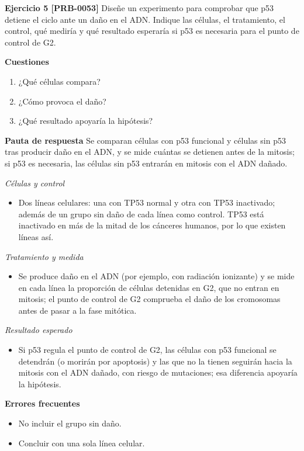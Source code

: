 \documentclass{book}
\begin{document}
\noindent\textbf{Ejercicio 5 [PRB-0053]}
Diseñe un experimento para comprobar que p53 detiene el ciclo ante un daño en el ADN. Indique las células, el tratamiento, el control, qué mediría y qué resultado esperaría si p53 es necesaria para el punto de control de G2.


\noindent\textbf{Cuestiones}
\begin{enumerate}
\item ¿Qué células compara?
\item ¿Cómo provoca el daño?
\item ¿Qué resultado apoyaría la hipótesis?
\end{enumerate}

\noindent\textbf{Pauta de respuesta}
Se comparan células con p53 funcional y células sin p53 tras producir daño en el ADN, y se mide cuántas se detienen antes de la mitosis; si p53 es necesaria, las células sin p53 entrarán en mitosis con el ADN dañado.


\noindent\textit{Células y control}
\begin{itemize}
\item Dos líneas celulares: una con TP53 normal y otra con TP53 inactivado; además de un grupo sin daño de cada línea como control. TP53 está inactivado en más de la mitad de los cánceres humanos, por lo que existen líneas así.
\end{itemize}

\noindent\textit{Tratamiento y medida}
\begin{itemize}
\item Se produce daño en el ADN (por ejemplo, con radiación ionizante) y se mide en cada línea la proporción de células detenidas en G2, que no entran en mitosis; el punto de control de G2 comprueba el daño de los cromosomas antes de pasar a la fase mitótica.
\end{itemize}

\noindent\textit{Resultado esperado}
\begin{itemize}
\item Si p53 regula el punto de control de G2, las células con p53 funcional se detendrán (o morirán por apoptosis) y las que no la tienen seguirán hacia la mitosis con el ADN dañado, con riesgo de mutaciones; esa diferencia apoyaría la hipótesis.
\end{itemize}

\noindent\textbf{Errores frecuentes}
\begin{itemize}
\item No incluir el grupo sin daño.
\item Concluir con una sola línea celular.
\end{itemize}
\end{document}
